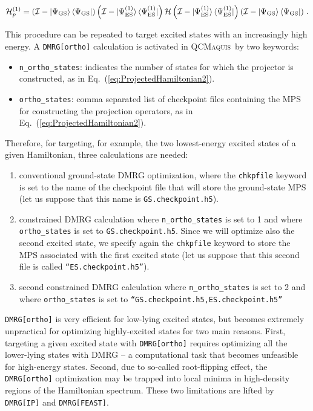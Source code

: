 \documentclass[bibliography=totoc,12pt,a4paper]{scrartcl}
\newcommand{\qcm}{\textsc{QCMaquis}}
\begin{document}
\begin{equation}
  \mathcal{H}_p^{(1)} = \left( \mathcal{I} - \ket{\Psi_\text{GS}} \bra{\Psi_\text{GS}} \right)
						\left( \mathcal{I} - \ket{\Psi_\text{ES}^{(1)}} \bra{\Psi_\text{ES}^{(1)}} \right)
  				  		\mathcal{H}
						\left( \mathcal{I} - \ket{\Psi_\text{ES}^{(1)}} \bra{\Psi_\text{ES}^{(1)}} \right)
				  		\left( \mathcal{I} - \ket{\Psi_\text{GS}} \bra{\Psi_\text{GS}} \right) \, .
  \label{eq:ProjectedHamiltonian2}
\end{equation}

\noindent This procedure can be repeated to target excited states with an increasingly high energy.
A \texttt{DMRG[ortho]} calculation is activated in \qcm\ by two keywords:

\begin{itemize}
  \item \texttt{n\_ortho\_states}: indicates the number of states for which the projector is constructed, as in Eq.~(\ref{eq:ProjectedHamiltonian2}).
  \item \texttt{ortho\_states}: comma separated list of checkpoint files containing the MPS for constructing the projection operators, as in Eq.~(\ref{eq:ProjectedHamiltonian2}).
\end{itemize}
%
Therefore, for targeting, for example, the two lowest-energy excited states of a given Hamiltonian, three calculations are needed:

\begin{enumerate}
  \item conventional ground-state DMRG optimization, where the \texttt{chkpfile} keyword is set to the name of the checkpoint file that will store the ground-state MPS (let us suppose that this name is \texttt{GS.checkpoint.h5}).
  \item constrained DMRG calculation where \texttt{n\_ortho\_states} is set to 1 and where \texttt{ortho\_states} is set to \texttt{GS.checkpoint.h5}.
  Since we will optimize also the second excited state, we specify again the \texttt{chkpfile} keyword to store the MPS associated with the first excited state (let us suppose that this second file is called \texttt{``ES.checkpoint.h5''}).
  \item second constrained DMRG calculation where \texttt{n\_ortho\_states} is set to 2 and where \texttt{ortho\_states} is set to \texttt{``GS.checkpoint.h5,ES.checkpoint.h5''}
\end{enumerate}

\noindent \texttt{DMRG[ortho]} is very efficient for low-lying excited states, but becomes extremely unpractical for optimizing highly-excited states for two main reasons.
First, targeting a given excited state with \texttt{DMRG[ortho]} requires optimizing all the lower-lying states with DMRG -- a computational task that becomes unfeasible for high-energy states.
Second, due to so-called root-flipping effect, the \texttt{DMRG[ortho]} optimization may be trapped into local minima in high-density regions of the Hamiltonian spectrum.
These two limitations are lifted by \texttt{DMRG[IP]} and \texttt{DMRG[FEAST]}.
\end{document}
